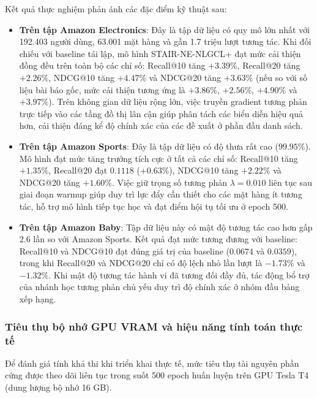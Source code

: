 Kết quả thực nghiệm phản ánh các đặc điểm kỹ thuật sau:
\begin{itemize}[leftmargin=*]
    \item \textbf{Trên tập Amazon Electronics}: Đây là tập dữ liệu có quy mô lớn nhất với 192.403 người dùng, 63.001 mặt hàng và gần 1.7 triệu lượt tương tác. Khi đối chiếu với baseline tái lập, mô hình STAIR-NE-NLGCL+ đạt mức cải thiện đồng đều trên toàn bộ các chỉ số: Recall@10 tăng $+3.39\%$, Recall@20 tăng $+2.26\%$, NDCG@10 tăng $+4.47\%$ và NDCG@20 tăng $+3.63\%$ (nếu so với số liệu bài báo gốc, mức cải thiện tương ứng là $+3.86\%$, $+2.56\%$, $+4.90\%$ và $+3.97\%$). Trên không gian dữ liệu rộng lớn, việc truyền gradient tương phản trực tiếp vào các tầng đồ thị lân cận giúp phân tách các biểu diễn hiệu quả hơn, cải thiện đáng kể độ chính xác của các đề xuất ở phần đầu danh sách.
    \item \textbf{Trên tập Amazon Sports}: Đây là tập dữ liệu có độ thưa rất cao ($99.95\%$). Mô hình đạt mức tăng trưởng tích cực ở tất cả các chỉ số: Recall@10 tăng $+1.35\%$, Recall@20 đạt $0.1118$ ($+0.63\%$), NDCG@10 tăng $+2.22\%$ và NDCG@20 tăng $+1.60\%$. Việc giữ trọng số tương phản $\lambda = 0.010$ liên tục sau giai đoạn warmup giúp duy trì lực đẩy cần thiết cho các mặt hàng ít tương tác, hỗ trợ mô hình tiếp tục học và đạt điểm hội tụ tối ưu ở epoch 500.
    \item \textbf{Trên tập Amazon Baby}: Tập dữ liệu này có mật độ tương tác cao hơn gấp 2.6 lần so với Amazon Sports. Kết quả đạt mức tương đương với baseline: Recall@10 và NDCG@10 đạt đúng giá trị của baseline ($0.0674$ và $0.0359$), trong khi Recall@20 và NDCG@20 chỉ có độ lệch nhỏ lần lượt là $-1.73\%$ và $-1.32\%$. Khi mật độ tương tác hành vi đã tương đối đầy đủ, tác động bổ trợ của nhánh học tương phản chủ yếu duy trì độ chính xác ở nhóm đầu bảng xếp hạng.
\end{itemize}

\subsubsection{Tiêu thụ bộ nhớ GPU VRAM và hiệu năng tính toán thực tế}

Để đánh giá tính khả thi khi triển khai thực tế, mức tiêu thụ tài nguyên phần cứng được theo dõi liên tục trong suốt 500 epoch huấn luyện trên GPU Tesla T4 (dung lượng bộ nhớ 16 GB).

